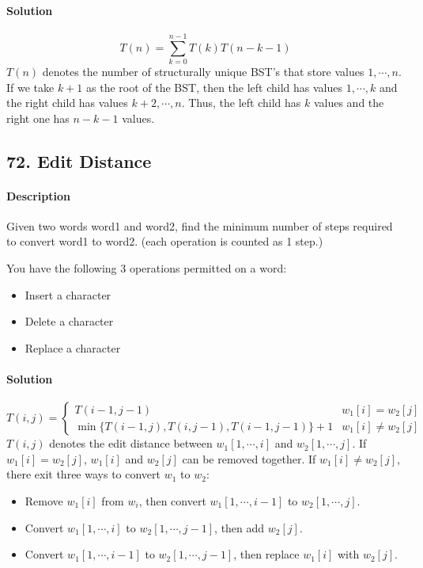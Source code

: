 \paragraph{Solution}
$$T(n)=\sum^{n-1}_{k=0}{T(k)T(n-k-1)}$$
$T(n)$ denotes the number of structurally unique BST's that store values $1,\cdots,n$. If we take $k+1$ as the root of the BST, then the left child has values $1,\cdots,k$ and the right child has values $k+2,\cdots,n$. Thus, the left child has $k$ values and the right one has $n-k-1$ values.

\subsection{72. Edit Distance}

\paragraph{Description}

Given two words word1 and word2, find the minimum number of steps required to convert word1 to word2. (each operation is counted as 1 step.)

You have the following 3 operations permitted on a word:
\begin{itemize}
    \item Insert a character
    \item Delete a character
    \item Replace a character
\end{itemize}

\paragraph{Solution}

\begin{equation*}
    T(i,j)=\begin{cases}
    T(i-1,j-1) & w_1[i]=w_2[j]\\
    \min\{T(i-1,j),T(i,j-1),T(i-1,j-1)\}+1 & w_1[i]\neq w_2[j]
    \end{cases}
\end{equation*}
$T(i,j)$ denotes the edit distance between $w_1[1,\cdots,i]$ and $w_2[1,\cdots,j]$. If $w_1[i]=w_2[j]$, $w_1[i]$ and $w_2[j]$ can be removed together. If $w_1[i]\neq w_2[j]$, there exit three ways to convert $w_1$ to $w_2$:
\begin{itemize}
    \item Remove $w_1[i]$ from $w_i$, then convert $w_1[1,\cdots,i-1]$ to $w_2[1,\cdots,j]$.
    \item Convert $w_1[1,\cdots,i]$ to $w_2[1,\cdots,j-1]$, then add $w_2[j]$.
    \item Convert $w_1[1,\cdots,i-1]$ to $w_2[1,\cdots,j-1]$, then replace $w_1[i]$ with $w_2[j]$.
\end{itemize}